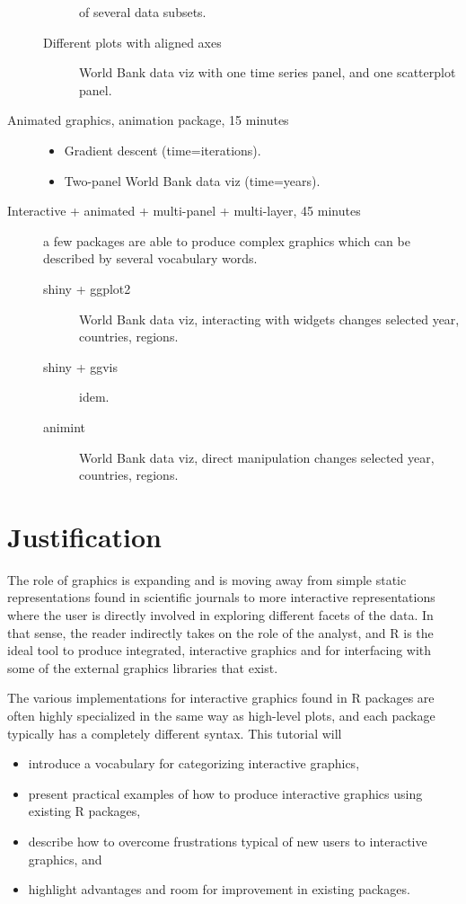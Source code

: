 \documentclass[11pt]{article}
\begin{document}
\begin{description}
\begin{description}
of several data subsets.
\item[{Different plots with aligned axes}] World Bank data viz with one
time series panel, and one scatterplot panel.
\end{description}
\item[{Animated graphics, animation package, 15 minutes}] \begin{itemize}
\item Gradient descent (time=iterations).
\item Two-panel World Bank data viz (time=years).
\end{itemize}
\item[{Interactive + animated + multi-panel + multi-layer, 45 minutes}] a
few packages are able to produce complex graphics which can be
described by several vocabulary words.
\begin{description}
\item[{shiny + ggplot2}] World Bank data viz, interacting with widgets
changes selected year, countries, regions.
\item[{shiny + ggvis}] idem.
\item[{animint}] World Bank data viz, direct manipulation changes
selected year, countries, regions.
\end{description}
\end{description}

\section{Justification}
\label{sec:orgheadline11}

The role of graphics is expanding and is moving away from simple
static representations found in scientific journals to more
interactive representations where the user is directly involved in
exploring different facets of the data. In that sense, the reader
indirectly takes on the role of the analyst, and R is the ideal tool
to produce integrated, interactive graphics and for interfacing with
some of the external graphics libraries that exist.

The various implementations for interactive graphics found in R
packages are often highly specialized in the same way as high-level
plots, and each package typically has a completely different
syntax. This tutorial will 
\begin{itemize}
\item introduce a vocabulary for categorizing interactive graphics,
\item present practical examples of how to produce interactive graphics
using existing R packages,
\item describe how to overcome frustrations typical of new users to
interactive graphics, and
\item highlight advantages and room for improvement in existing
packages.
\end{itemize}
\end{document}

